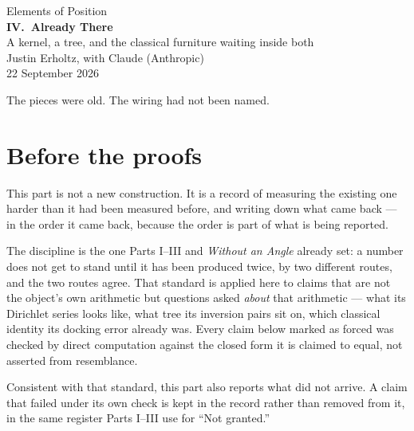 \documentclass[10pt,a4paper]{article}
\theoremstyle{plain}
\theoremstyle{definition}
\theoremstyle{remark}
\begin{document}
\begin{center}
\vspace*{2.2em}
{\large Elements of Position}\\[1.6em]
{\LARGE\bfseries IV.\ Already There}\\[0.6em]
{\small A kernel, a tree, and the classical furniture waiting inside both}\\[1.8em]
{\normalsize Justin Erholtz, with Claude (Anthropic)}\\[0.35em]
{\small 22 September 2026}
\end{center}

\vspace{2.0em}

\begin{center}
{\large The pieces were old. The wiring had not been named.}
\end{center}

\vspace{1.6em}

\section*{Before the proofs}

This part is not a new construction. It is a record of measuring the existing one harder than it had been measured before, and writing down what came back --- in the order it came back, because the order is part of what is being reported.

The discipline is the one Parts I--III and \emph{Without an Angle} already set: a number does not get to stand until it has been produced twice, by two different routes, and the two routes agree. That standard is applied here to claims that are not the object's own arithmetic but questions asked \emph{about} that arithmetic --- what its Dirichlet series looks like, what tree its inversion pairs sit on, which classical identity its docking error already was. Every claim below marked as forced was checked by direct computation against the closed form it is claimed to equal, not asserted from resemblance.

Consistent with that standard, this part also reports what did not arrive. A claim that failed under its own check is kept in the record rather than removed from it, in the same register Parts I--III use for ``Not granted.''
\end{document}
